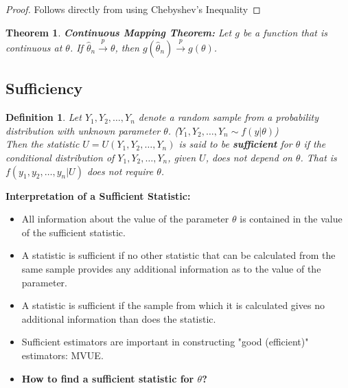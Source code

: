 \documentclass[a4paper,12pt]{article}
\theoremstyle{nonitalic}
\newtheorem{definition}{Definition}[subsection]
\newtheorem{theorem}{Theorem}[subsection]
\begin{document}
    \begin{proof}
        Follows directly from using Chebyshev's Inequality
    \end{proof}

    \begin{theorem}
        \textbf{Continuous Mapping Theorem:} Let \(g\) be a function that is continuous at \(\theta\). If \(\hat{\theta}_n \xrightarrow{p} \theta\), then \(g(\hat{\theta}_n) \xrightarrow{p} g(\theta)\).
    \end{theorem}

    \newpage

    \subsection{Sufficiency}

    \begin{definition}
        Let \( Y_1, Y_2, \ldots, Y_n \) denote a random sample from a probability distribution with unknown parameter \(\theta\). (\( Y_1, Y_2, \ldots, Y_n \sim f(y|\theta)\))\\
        Then the statistic \( U = U(Y_1, Y_2, \ldots, Y_n) \) is said to be \textbf{sufficient} for \(\theta\) if the conditional distribution of \( Y_1, Y_2, \ldots, Y_n \), given \( U \), does not depend on \(\theta\). That is $f(y_1, y_2, \ldots, y_n | U)$ does not require $\theta$.
    \end{definition}

    \bigskip
        
    \textbf{Interpretation of a Sufficient Statistic:}
    \begin{itemize}
        \item All information about the value of the parameter \(\theta\) is contained in the value of the sufficient statistic.
        \item A statistic is sufficient if no other statistic that can be calculated from the same sample provides any additional information as to the value of the parameter.
        \item A statistic is sufficient if the sample from which it is calculated gives no additional information than does the statistic.
    \end{itemize}
        
    \begin{itemize}
        \item Sufficient estimators are important in constructing "good (efficient)" estimators: MVUE.
        \item \textbf{How to find a sufficient statistic for \(\theta\)?}
    \end{itemize}
\end{document}
